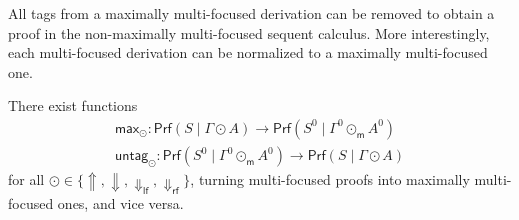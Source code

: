 \documentclass[runningheads]{llncs}
\newcommand{\lfm}{\dn_\mathsf{lfm}}%
\newcommand{\rfm}{\dn_\mathsf{rfm}}%
\newcommand{\lf}{\dn_\mathsf{lf}}%
\newcommand{\rf}{\dn_\mathsf{rf}}%
\newcommand{\green}[1]{{#1^0}}
\newcommand{\up}{\Uparrow}
\newcommand{\dn}{\Downarrow}
\newcommand{\upm}{\Uparrow_{\mathsf{m}}}
\newcommand{\dnm}{\Downarrow_{\mathsf{m}}}
\newcommand{\Prf}{\mathsf{Prf}}
\begin{document}
All tags from a maximally multi-focused derivation can be removed to obtain a proof in the non-maximally multi-focused sequent calculus. 
More interestingly, each multi-focused derivation can be normalized to a maximally multi-focused one. %
\begin{theorem}\label{thm2}
  There exist functions
  \[
  \begin{array}{l}%
    \mathsf{max}_\odot : \Prf(S \mid \Gamma \odot A) \to \Prf(\green{S} \mid \green{\Gamma} \odot_\mathsf{m} \green{A}) \\
    \mathsf{untag}_\odot : \Prf(\green{S} \mid \green{\Gamma} \odot_{\mathsf{m}} \green{A}) \to \Prf(S \mid \Gamma \odot A) %
  \end{array}
  \]
 for all $\odot \in \{\up,\dn,\lf,\rf \}$, turning multi-focused proofs into maximally multi-focused ones, and vice versa.
\end{theorem}
\end{document}
